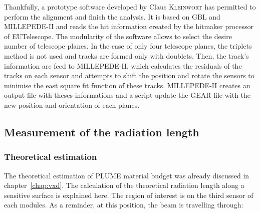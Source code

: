     Thankfully, a prototype software developed by Claus \textsc{Kleinwort} has permitted to perform the alignment and finish the analysis. 
    It is based on \gls{GBL} and MILLEPEDE-II and reads the hit information created by the hitmaker processor of EUTelescope. 
    The modularity of the software allows to select the desire number of telescope planes.
    In the case of only four telescope planes, the triplets method is not used and tracks are formed only with doublets.
    Then, the track's information are feed to MILLEPEDE-II, which calculates the residuals of the tracks on each sensor and attempts to shift the position and rotate the sensors to minimise the east square fit function of these tracks.
    MILLEPEDE-II creates an output file with theses informations and a script update the GEAR file with the new position and orientation of each planes.




   \subsection{Measurement of the radiation length}

     \subsubsection{Theoretical estimation}

     The theoretical estimation of \gls{PLUME} material budget was already discussed in chapter~\ref{chap:vxd}.
     The calculation of the theoretical radiation length along a sensitive surface is explained here.
     The region of interest is on the third sensor of each modules. 
     As a reminder, at this position, the beam is travelling through:
     

